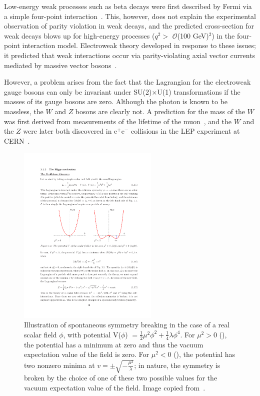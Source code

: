 Low-energy weak processes such as beta decays were first described by Fermi via a simple four-point interaction~\cite{0034-4885-42-12-001}. This, however, does not explain the experimental observation of parity violation in weak decays, and the predicted cross-section for weak decays blows up for high-energy processes ($q^2 >$ $\mathcal{O}$(100 GeV)$^2$) in the four-point interaction model. Electroweak theory developed in response to these issues; it predicted that weak interactions occur via parity-violating axial vector currents mediated by massive vector bosons~\cite{PerkinsPhysics}.

However, a problem arises from the fact that the Lagrangian for the electroweak gauge bosons can only be invariant under SU(2)$\times$U(1) transformations if the masses of its gauge bosons are zero. Although the photon is known to be massless, the $W$ and $Z$ bosons are clearly not. A prediction for the mass of the $W$ was first derived from measurements of the lifetime of the muon~\cite{Thomson}, and the $W$ and the $Z$ were later both discovered in e$^{+}$e$^{-}$ collisions in the LEP experiment at CERN~\cite{Arnison:1983rp,Arnison:1983mk}.

\begin{figure}
   \begin{center}
      \includegraphics[width=0.6\textwidth]{figures/intro-Higgspotential}
      \caption{Illustration of spontaneous symmetry breaking in the case of a real scalar field $\phi$, with potential V($\phi$) $= \frac{1}{2}\mu^2\phi^2 + \frac{1}{4}\lambda\phi^4$. For $\mu^2 > 0$ (\cmsLeft), the potential has a minimum at zero and thus the vacuum expectation value of the field is zero. For $\mu^2 < 0$ (\cmsRight), the potential has two nonzero minima at $v = \pm\sqrt{-\frac{\mu^2}{\lambda}}$; in nature, the symmetry is broken by the choice of one of these two possible values for the vacuum expectation value of the field. Image copied from~\cite{Djouadi:2005gi}.}
      \label{fig:higgspotential}
   \end{center}
\end{figure}

